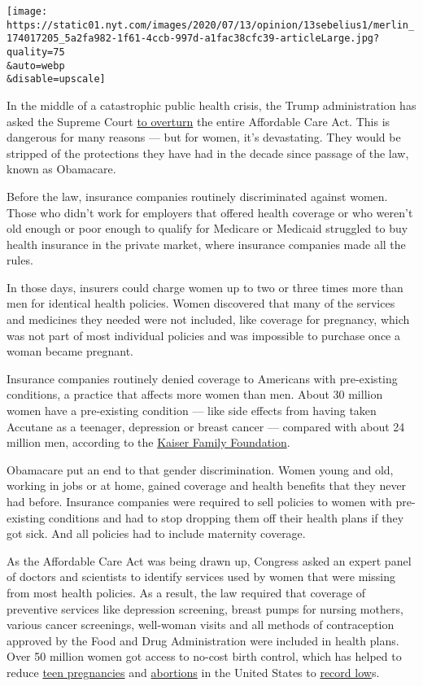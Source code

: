 \texttt{[image: https://static01.nyt.com/images/2020/07/13/opinion/13sebelius1/merlin\_174017205\_5a2fa982-1f61-4ccb-997d-a1fac38cfc39-articleLarge.jpg?quality=75\\\&auto=webp\\\&disable=upscale]}

In the middle of a catastrophic public health crisis, the Trump
administration has asked the Supreme Court
\href{https://www.nytimes.com/2020/06/26/us/politics/obamacare-trump-administration-supreme-court.html}{to
overturn} the entire Affordable Care Act. This is dangerous for many
reasons --- but for women, it's devastating. They would be stripped of
the protections they have had in the decade since passage of the law,
known as Obamacare.

Before the law, insurance companies routinely discriminated against
women. Those who didn't work for employers that offered health coverage
or who weren't old enough or poor enough to qualify for Medicare or
Medicaid struggled to buy health insurance in the private market, where
insurance companies made all the rules.

In those days, insurers could charge women up to two or three times more
than men for identical health policies. Women discovered that many of
the services and medicines they needed were not included, like coverage
for pregnancy, which was not part of most individual policies and was
impossible to purchase once a woman became pregnant.

Insurance companies routinely denied coverage to Americans with
pre-existing conditions, a practice that affects more women than men.
About 30 million women have a pre-existing condition --- like side
effects from having taken Accutane as a teenager, depression or breast
cancer --- compared with about 24 million men, according to the
\href{https://www.kff.org/health-reform/issue-brief/pre-existing-condition-prevalence-for-individuals-and-families/}{Kaiser
Family Foundation}.

Obamacare put an end to that gender discrimination. Women young and old,
working in jobs or at home, gained coverage and health benefits that
they never had before. Insurance companies were required to sell
policies to women with pre-existing conditions and had to stop dropping
them off their health plans if they got sick. And all policies had to
include maternity coverage.

As the Affordable Care Act was being drawn up, Congress asked an expert
panel of doctors and scientists to identify services used by women that
were missing from most health policies. As a result, the law required
that coverage of preventive services like depression screening, breast
pumps for nursing mothers, various cancer screenings, well-woman visits
and all methods of contraception approved by the Food and Drug
Administration were included in health plans. Over 50 million women got
access to no-cost birth control, which has helped to reduce
\href{https://www.pewresearch.org/fact-tank/2019/08/02/why-is-the-teen-birth-rate-falling/}{teen
pregnancies} and
\href{https://www.guttmacher.org/fact-sheet/induced-abortion-united-states}{abortions}
in the United States to
\href{https://www.pewresearch.org/fact-tank/2019/08/02/why-is-the-teen-birth-rate-falling/}{record
low}s.

